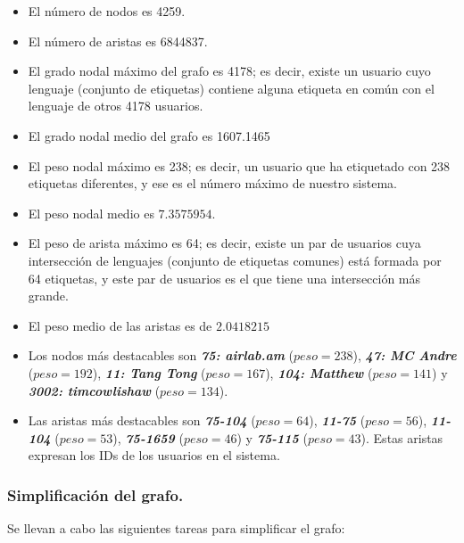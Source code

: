 \begin{itemize}
\item    El número de nodos es 4259.
\item    El número de aristas es 6844837.
\item    El grado nodal máximo del grafo es 4178; es decir, existe un usuario cuyo lenguaje (conjunto de etiquetas) contiene alguna etiqueta en común con el lenguaje de otros 4178 usuarios.
\item    El grado nodal medio del grafo es 1607.1465
\item    El peso nodal máximo es 238; es decir, un usuario que ha etiquetado con 238 etiquetas diferentes, y ese es el número máximo de nuestro sistema.
\item    El peso nodal medio es $7.3575954$.
\item    El peso de arista máximo es 64; es decir, existe un par de usuarios cuya intersección de lenguajes (conjunto de etiquetas comunes) está formada por 64 etiquetas, y este par de usuarios es el que tiene una intersección más grande.
\item    El peso medio de las aristas es de $2.0418215$
\item Los nodos más destacables son \emph{{\bf 75: airlab.am}} ($peso=238$), \emph{{\bf 47: MC Andre}} ($peso=192$), \emph{{\bf 11: Tang Tong}} ($peso=167$), \emph{{\bf 104: Matthew}} ($peso=141$) y \emph{{\bf 3002: timcowlishaw}} ($peso=134$).
\item Las aristas más destacables son \emph{{\bf 75-104}} ($peso=64$), \emph{{\bf 11-75}} ($peso=56$), \emph{{\bf 11-104}} ($peso=53$), \emph{{\bf 75-1659}} ($peso=46$) y \emph{{\bf 75-115}} ($peso=43$). Estas aristas expresan los IDs de los usuarios en el sistema.
\end{itemize}

\subsubsection{Simplificación del grafo.}

Se llevan a cabo las siguientes tareas para simplificar el grafo:

